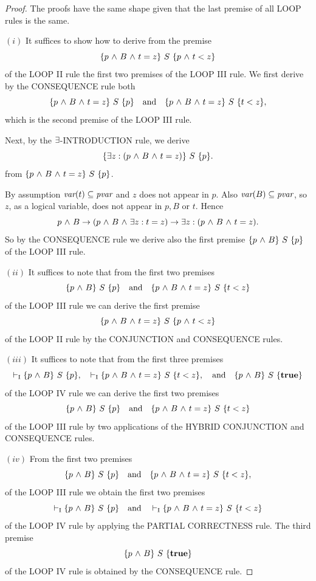 \documentclass[runningheads]{llncs}       %
\begin{document}
\begin{proof}
The proofs have the same shape given that the last premise of all LOOP rules is the same.
  
\NI
$(i)$ It suffices to show how to derive from the premise
\[
  \mbox{$\{{p \mbox{$\ \wedge\ $} B \mbox{$\ \wedge\ $} t=z}\}\ {S}\ \{{p \mbox{$\ \wedge\ $} t<z}\}$}
\]
of the LOOP II rule the first two premises of the LOOP III rule.  We
first derive by the CONSEQUENCE rule both
\[
 \mbox{$\{{p \mbox{$\ \wedge\ $} B \mbox{$\ \wedge\ $} t=z}\}\ {S}\ \{{p}\}$} \quad \mbox{\rm and} \quad
\mbox{$\{{p \mbox{$\ \wedge\ $} B \mbox{$\ \wedge\ $} t=z}\}\ {S}\ \{{t<z}\}$},
\]
which is the second premise of the LOOP III rule.

Next, by the $\mbox{$\exists$}$-INTRODUCTION rule, we derive 
\[
 \mbox{$\{{\mbox{$\exists$} z: (p \mbox{$\ \wedge\ $} B \mbox{$\ \wedge\ $} t=z)}\}\ {S}\ \{{p}\}$}.
\]
from
$\mbox{$\{{p \mbox{$\ \wedge\ $} B \mbox{$\ \wedge\ $} t=z}\}\ {S}\ \{{p}\}$}$.

By assumption $\mbox{\it var}(t)\subseteq \mbox{\it pvar}$ and $z$ does not appear in $p$. Also
$\mbox{\it var}(B)\subseteq \mbox{\it pvar}$, so
$z$, as a logical variable, does not appear
in $p, B$ or $t$. Hence
\[
  p \mbox{$\ \wedge\ $} B \to (p \mbox{$\ \wedge\ $} B \mbox{$\ \wedge\ $} \mbox{$\exists$} z: t=z) \to  \mbox{$\exists$} z: (p \mbox{$\ \wedge\ $} B \mbox{$\ \wedge\ $} t=z).
\]
So by the CONSEQUENCE rule we derive also the first premise
$\mbox{$\{{p \mbox{$\ \wedge\ $} B}\}\ {S}\ \{{p}\}$}$ of the LOOP III rule.
\III

\NI
$(ii)$ It suffices to note that from the first two premises 
\[
  \mbox{$\{{p \mbox{$\ \wedge\ $} B}\}\ {S}\ \{{p}\}$}\quad \mbox{\rm and} \quad
   \mbox{$\{{p \mbox{$\ \wedge\ $} B \mbox{$\ \wedge\ $} t=z}\}\ {S}\ \{{t<z}\}$}
\]
of the LOOP III rule we can derive the first premise
\[
  \mbox{$\{{p \mbox{$\ \wedge\ $} B \mbox{$\ \wedge\ $} t=z}\}\ {S}\ \{{p \mbox{$\ \wedge\ $} t<z}\}$}
\]
of the LOOP II rule by the CONJUNCTION and CONSEQUENCE rules.
\III

\NI
$(iii)$ 
It suffices to note that from the first three premises 
\[
  \vdash_{\rm{I}}  \mbox{$\{{p \mbox{$\ \wedge\ $} B}\}\ {S}\ \{{p}\}$},\quad
  \vdash_{\rm{I}}  \mbox{$\{{p \mbox{$\ \wedge\ $} B \mbox{$\ \wedge\ $} t=z}\}\ {S}\ \{{t<z}\}$},\quad
\mbox{\rm and} \quad
 \mbox{$\{{p \mbox{$\ \wedge\ $} B}\}\ {S}\ \{{\mathbf{true}}\}$}
\]
of the LOOP IV rule
we can derive the first two premises
\[
  \mbox{$\{{p \mbox{$\ \wedge\ $} B}\}\ {S}\ \{{p}\}$} \quad
  \mbox{\rm and} \quad \mbox{$\{{p \mbox{$\ \wedge\ $} B \mbox{$\ \wedge\ $} t=z}\}\ {S}\ \{{t<z}\}$}
\]
of the LOOP III rule by two applications of the HYBRID CONJUNCTION and
CONSEQUENCE rules.
\III

\NI
$(iv)$
From the first two premises
\[
  \mbox{$\{{p \mbox{$\ \wedge\ $} B}\}\ {S}\ \{{p}\}$}
\quad
\mbox{\rm and} \quad
   \mbox{$\{{p \mbox{$\ \wedge\ $} B \mbox{$\ \wedge\ $} t=z}\}\ {S}\ \{{t<z}\}$},
\]
of the LOOP III rule
we obtain the first two premises
$$\vdash_{\rm{I}}  \mbox{$\{{p \mbox{$\ \wedge\ $} B}\}\ {S}\ \{{p}\}$}
\quad
\mbox{\rm and} \quad \vdash_{\rm{I}}  \mbox{$\{{p \mbox{$\ \wedge\ $} B \mbox{$\ \wedge\ $} t=z}\}\ {S}\ \{{t<z}\}$}$$
of the LOOP IV rule
by applying the PARTIAL CORRECTNESS rule.
The third premise
\[
  \mbox{$\{{p \mbox{$\ \wedge\ $} B}\}\ {S}\ \{{\mathbf{true}}\}$}
\]
of the LOOP IV rule is obtained by the CONSEQUENCE rule.
\HB


\end{proof}
\end{document}
